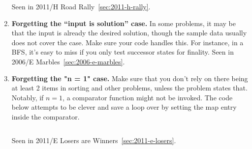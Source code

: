\begin{enumerate}
    Seen in 2011/H Road Rally~\ref{sec:2011-h-rally}.

\item \textbf{Forgetting the ``input is solution'' case.}
    In some problems, it may be that the input is already the desired solution, though the
    sample data usually does not cover the case.
    Make sure your code handles this.  For instance, in a BFS, it's easy to miss if you only
    test successor states for finality.
    Seen in 2006/E Marbles~\ref{sec:2006-e-marbles}.

\item \textbf{Forgetting the "n = 1" case.}
    Make sure that you don't rely on there being at least 2 items in sorting and other
    problems, unless the problem states that.  Notably, if $n = 1$, a comparator
    function might not be invoked.
    The code below attempts to be clever and save a loop over  by setting the 
     map entry inside the comparator.

    \inputminted[fontsize=\footnotesize,linenos=true]{java}{code/sortn1bug.java}

    Seen in 2011/E Losers are Winners~\ref{sec:2011-e-losers}.

\end{enumerate}

